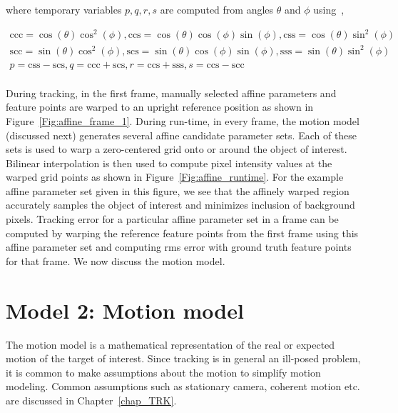 \begin{enumerate}
where temporary variables $p, q, r, s$ are computed from angles $\theta$ and $\phi$ using~\cite{2008_JNL_subspaceTRK_Ross},

\begin{equation}
\begin{array}{llll}
\mathrm{ccc} = \cos(\theta) \cos^2(\phi), \mathrm{ccs} = \cos(\theta) \cos(\phi) \sin(\phi), \mathrm{css} = \cos(\theta) \sin^2(\phi)\\
\mathrm{scc} = \sin(\theta) \cos^2(\phi), \mathrm{scs} = \sin(\theta) \cos(\phi) \sin(\phi), \mathrm{sss} = \sin(\theta) \sin^2(\phi)\\
p   =  \mathrm{css} - \mathrm{scs}, q   =  \mathrm{ccc} + \mathrm{scs}, r  = \mathrm{ccs} + \mathrm{sss}, s =  \mathrm{ccs} - \mathrm{scc}\\
\end{array}
\end{equation}
\end{enumerate}

During tracking, in the first frame, manually selected affine parameters and feature points are warped to an upright reference position as shown in Figure~\ref{Fig:affine_frame_1}.  During run-time, in every frame, the motion model (discussed next) generates several affine candidate parameter sets.  Each of these sets is used to warp a zero-centered grid onto or around the object of interest.  Bilinear interpolation is then used to compute pixel intensity values at the warped grid points as shown in Figure~\ref{Fig:affine_runtime}.  For the example affine parameter set given in this figure, we see that the affinely warped region accurately samples the object of interest and minimizes inclusion of background pixels.  Tracking error for a particular affine parameter set in a frame can be computed by warping the reference feature points from the first frame using this affine parameter set and computing rms error with ground truth feature points for that frame.  We now discuss the motion model.






\section{Model 2: Motion model}
The motion model is a mathematical representation of the real or expected motion of the target of interest.  Since tracking is in general an ill-posed problem, it is common to make assumptions about the motion to simplify motion modeling.  Common assumptions such as stationary camera, coherent motion etc. are discussed in Chapter~\ref{chap_TRK}.

